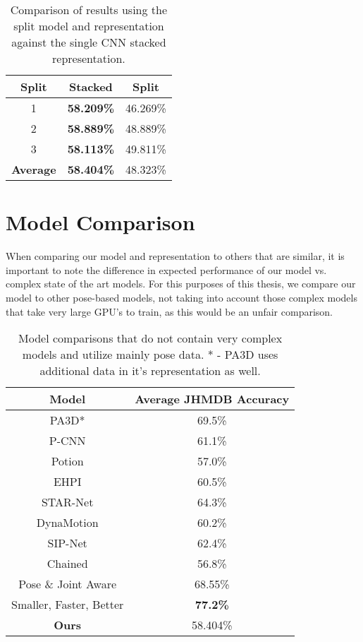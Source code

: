 \begin{table}[ht]
	\centering
	\begin{tabular}{||c c c||} 
		\hline
		\textbf{Split} & \textbf{Stacked} & \textbf{Split} \\ [0.5ex] 
		\hline\hline
		1 & \textbf{58.209\%} & 46.269\% \\ 
		\hline
		2 & \textbf{58.889\%} & 48.889\% \\
		\hline
		3 & \textbf{58.113\%} & 49.811\% \\
		\hline
		\hline
		\textbf{Average} & \textbf{58.404\%} & 48.323\% \\
		\hline
	\end{tabular}
	\caption{Comparison of results using the split model and representation against the single CNN stacked representation.}
	\label{tab:acc-results-v-split}
\end{table}

\section{Model Comparison}

When comparing our model and representation to others that are similar, it is important to note the difference in expected performance of our model vs. complex state of the art models. For this purposes of this thesis, we compare our model to other pose-based models, not taking into account those complex models that take very large GPU's to train, as this would be an unfair comparison.

\begin{table}[ht]
	\centering
	\begin{tabular}{||c c||} 
		\hline
		\textbf{Model} & \textbf{Average JHMDB Accuracy} \\
		\hline\hline
		PA3D* \cite{PA3D} & 69.5\% \\
		P-CNN \cite{PCNN} & 61.1\% \\
		Potion \cite{potion} & 57.0\% \\
		EHPI \cite{simple_yet_efficient} & 60.5\% \\
		STAR-Net \cite{star-net} & 64.3\% \\
		DynaMotion \cite{dynamic-motion} & 60.2\% \\
		SIP-Net \cite{sipnet} & 62.4\% \\
		Chained \cite{Chained} & 56.8\% \\
		Pose \& Joint Aware \cite{poseandjointaware} & 68.55\% \\
		Smaller, Faster, Better & \textbf{77.2\%} \\
		\hline\hline
		\textbf{Ours} & 58.404\% \\
		\hline
	\end{tabular}
	\caption{Model comparisons that do not contain very complex models and utilize mainly pose data. * - PA3D uses additional data in it's representation as well.}
	\label{tab:model-comparison}
\end{table}

